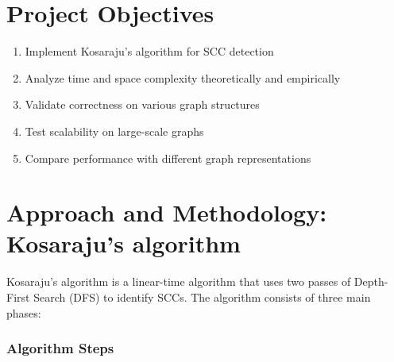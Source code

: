 \documentclass{book}
\theoremstyle{definition}
\begin{document}
\section{Project Objectives}
\begin{enumerate}
    \item Implement Kosaraju's algorithm for SCC detection
    \item Analyze time and space complexity theoretically and empirically
    \item Validate correctness on various graph structures
    \item Test scalability on large-scale graphs
    \item Compare performance with different graph representations
\end{enumerate}

\section{Approach and Methodology: Kosaraju's algorithm}


Kosaraju's algorithm is a linear-time algorithm that uses two passes of Depth-First Search (DFS) to identify SCCs. The algorithm consists of three main phases:

\subsubsection{Algorithm Steps}
\end{document}

